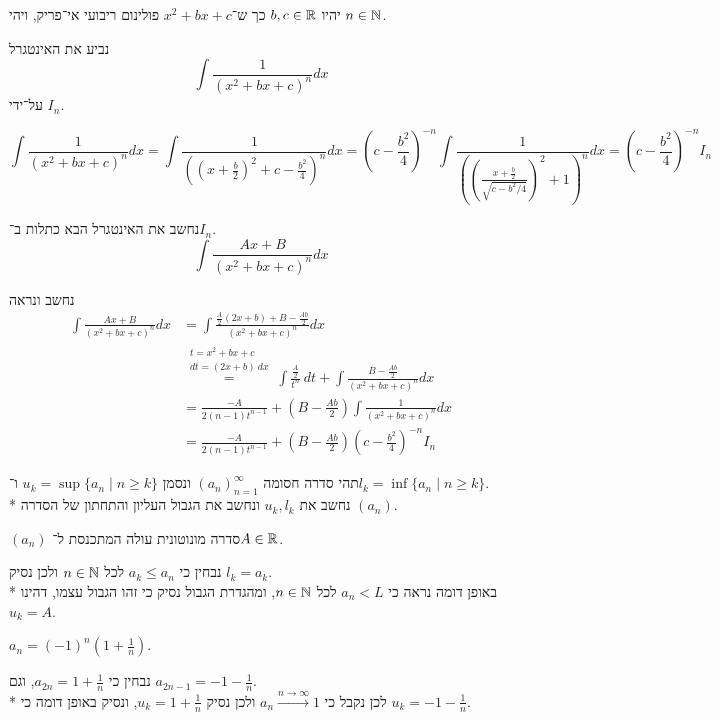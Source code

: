 \Question{}
יהיו $b, c \in \mathbb{R}$ כך ש־$x^2 + bx + c$ פולינום ריבועי אי־פריק, ויהי $n \in \mathbb{N}$.

\Subquestion{}
נביע את האינטגרל
\[
	\int \frac{1}{{(x^2 + bx + c)}^n} dx
\]
על־ידי $I_n$.

\[
	\int \frac{1}{{(x^2 + bx + c)}^n} dx
	= \int \frac{1}{{({(x + \frac{b}{2})}^2 + c - \frac{b^2}{4})}^n} dx
	= {(c - \frac{b^2}{4})}^{-n} \int \frac{1}{{({(\frac{x + \frac{b}{2}}{\sqrt{c - b^2/4}})}^2 + 1)}^n} dx
	= {(c - \frac{b^2}{4})}^{-n} I_n
\]

\Subquestion{}
נחשב את האינטגרל הבא כתלות ב־$I_n$.
\[
	\int \frac{Ax + B}{{(x^2 + bx + c)}^n} dx
\]

נחשב ונראה
\begin{align*}
	\int \frac{Ax + B}{{(x^2 + bx + c)}^n} dx
	& = \int \frac{\frac{A}{2}(2x + b) + B - \frac{A b}{2}}{{(x^2 + bx + c)}^n} dx \\
	& \overset{\begin{smallmatrix} t = x^2 + bx + c \\ dt = (2x + b)\ dx \end{smallmatrix}}{=}
	\int \frac{\frac{A}{2}}{{t}^n}\ dt + \int \frac{B - \frac{A b}{2}}{{(x^2 + bx + c)}^n} dx \\
	& = \frac{-A}{2 (n - 1) t^{n - 1}} + (B - \frac{A b}{2}) \int \frac{1}{{(x^2 + bx + c)}^n} dx \\
	& = \frac{-A}{2 (n - 1) t^{n - 1}} + (B - \frac{A b}{2}) {(c - \frac{b^2}{4})}^{-n} I_n
\end{align*}

\Question{}
תהי סדרה חסומה ${(a_n)}_{n = 1}^\infty$ ונסמן $u_k = \sup\{ a_n \mid n \ge k \}$ ו־$l_k = \inf\{ a_n \mid n \ge k \}$. \\*
נחשב את $u_k, l_k$ ונחשב את הגבול העליון והתחתון של הסדרה $(a_n)$.

\Subquestion{}
$(a_n)$ סדרה מונוטונית עולה המתכנסת ל־$A \in \mathbb{R}$.

נבחין כי $a_k \le a_n$ לכל $n \in \mathbb{N}$ ולכן נסיק $l_k = a_k$. \\*
באופן דומה נראה כי $a_n < L$ לכל $n \in \mathbb{N}$, ומהגדרת הגבול נסיק כי זהו הגבול עצמו, דהינו $u_k = A$.

\Subquestion{}
$a_n = {(-1)}^n (1 + \frac{1}{n})$.

נבחין כי $a_{2n} = 1 + \frac{1}{n}$, וגם $a_{2n - 1} = -1 - \frac{1}{n}$. \\*
לכן נקבל כי $a_n \xrightarrow{n \to \infty} 1$ ולכן נסיק $u_k = 1 + \frac{1}{n}$, ונסיק באופן דומה כי $u_k = -1 - \frac{1}{n}$.


